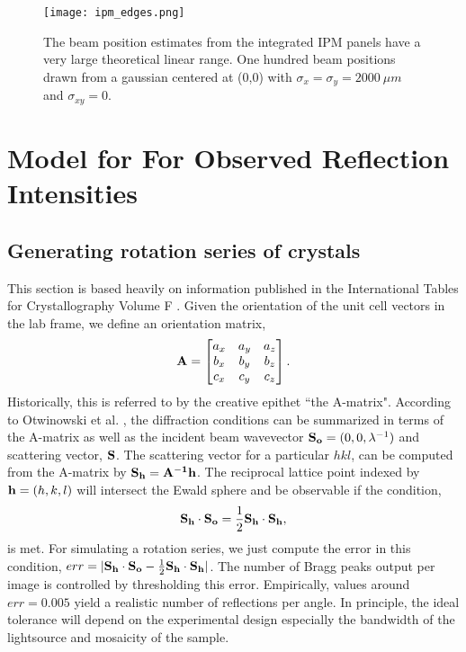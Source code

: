 \documentclass{report}
\begin{document}
\begin{figure} 
\centering
\texttt{[image: ipm\_edges.png]}
\caption{The beam position estimates from the integrated IPM panels have a very large theoretical linear range. One hundred beam positions drawn from a gaussian centered at (0,0) with $\sigma_x=\sigma_y=2000\ \mu m$ and $\sigma_{xy}=0$.}
\label{fig:ipm_linearity}
\end{figure}

\section{Model for For Observed Reflection Intensities}
\subsection{Generating rotation series of crystals}
This section is based heavily on information published in the International Tables for Crystallography Volume F \cite{Otwinowski2012-yb}. 
Given the orientation of the unit cell vectors in the lab frame, we define an orientation matrix, 
\begin{equation}
\bold{A}
=
\begin{bmatrix}
a_x & a_y & a_z \\
b_x & b_y & b_z \\
c_x & c_y & c_z \\
\end{bmatrix}.
\end{equation}
Historically, this is referred to by the creative epithet ``the A-matrix". 
According to Otwinowski et al. \cite{Otwinowski2012-yb}, the diffraction conditions can be summarized in terms of the A-matrix as well as the incident beam wavevector $\bold{S_o} = (0, 0, \lambda ^{-1})$ and scattering vector, $\bold{S}$. 
The scattering vector for a particular $hkl$, can be computed from the A-matrix by $\bold{S_h}=\bold{A^{-1}h}$. 
The reciprocal lattice point indexed by $\bold{h}=(h, k, l)$ will intersect the Ewald sphere and be observable if the condition,
\begin{equation}
\bold{S_h\cdot S_o} = \frac{1}{2}\bold{S_h\cdot S_h},
\end{equation}
is met. 
For simulating a rotation series, we just compute the error in this condition, $err = | \bold{S_h}\cdot \bold{S_o} - \frac{1}{2}\bold{S_h}\cdot \bold{S_h} |$. 
The number of Bragg peaks output per image is controlled by thresholding this error. 
Empirically, values around $err = 0.005$ yield a realistic number of reflections per angle. 
In principle, the ideal tolerance will depend on the experimental design especially the bandwidth of the lightsource and mosaicity of the sample. 
\end{document}
